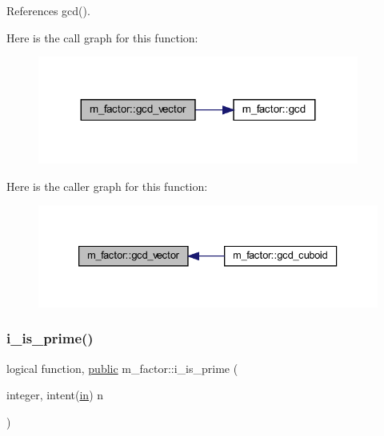References gcd().

Here is the call graph for this function\+:
\nopagebreak
\begin{figure}[H]
\begin{center}
\leavevmode
\includegraphics[width=299pt]{namespacem__factor_a60713d4c44895b4c18d4d6d9449ceaf7_cgraph}
\end{center}
\end{figure}
Here is the caller graph for this function\+:
\nopagebreak
\begin{figure}[H]
\begin{center}
\leavevmode
\includegraphics[width=333pt]{namespacem__factor_a60713d4c44895b4c18d4d6d9449ceaf7_icgraph}
\end{center}
\end{figure}
\mbox{\label{namespacem__factor_afcca43d3d524f6d11d54bbfd475e60d5}} 
\subsubsection{\texorpdfstring{i\+\_\+is\+\_\+prime()}{i\_is\_prime()}}
{\footnotesize\ttfamily logical function, \hyperlink{M__stopwatch_83_8txt_a2f74811300c361e53b430611a7d1769f}{public} m\+\_\+factor\+::i\+\_\+is\+\_\+prime (\begin{DoxyParamCaption}\item[{integer, intent(\hyperlink{M__journal_83_8txt_afce72651d1eed785a2132bee863b2f38}{in})}]{n }\end{DoxyParamCaption})}



